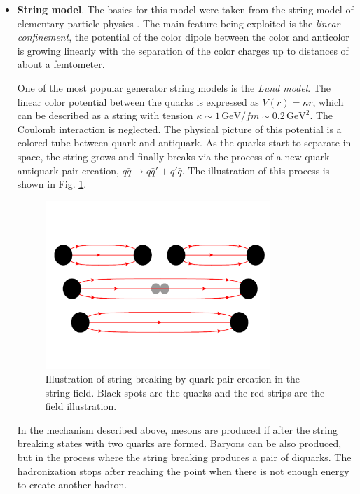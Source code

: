 \begin{itemize}
 \item \textbf{String model}. The basics for this model were taken from the string model of elementary particle physics \cite{Artru:1974hr}.
 The main feature being exploited is the \textit{linear confinement}, the potential of the color dipole 
 between the color and anticolor is growing linearly with the separation of the color charges up to distances of about a femtometer.
 
 One of the most popular generator string models is the \textit{Lund model}\cite{ANDERSSON1987513}. The linear color potential between the quarks is 
 expressed as $V(r) = \kappa r$, which can be described as a string with tension $\kappa \sim 1\,\text{GeV}/fm \sim 0.2\,\text{GeV}^{2}$. 
 The Coulomb interaction is neglected. The physical picture of this potential is a colored tube between quark
 and antiquark. As the quarks start to separate in space, the string grows and finally breaks via the process of a new quark-antiquark
 pair creation, $q\bar{q} \rightarrow q\bar{q}' + q'\bar{q}$. The illustration of this process is shown in Fig. \ref{fig:Lund}. 
 \begin{figure}[h]
  \centering
  \includegraphics[width=0.8\textwidth]{03_simulation/plots/Lund_hadr.pdf}
  \caption{Illustration of string breaking by quark pair-creation in the string field. Black spots are the quarks and the red
  strips are the field illustration.}
  \label{fig:Lund}
 \end{figure} 
%  
 In the mechanism described above, mesons are produced if after the string breaking states with two quarks are formed. 
 Baryons can be also produced, but in the process where the string breaking produces a pair of diquarks.
 The hadronization stops after reaching the point when there is not enough energy to create another hadron.
 

\end{itemize}
